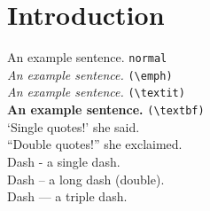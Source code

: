 \section{Introduction}

An example sentence. \texttt{normal}\\
\emph{An example sentence.} \texttt{(\textbackslash emph)}\\
\textit{An example sentence.} \texttt{(\textbackslash textit)}\\
\textbf{An example sentence.} \texttt{(\textbackslash textbf)}\\
`Single quotes!' she said.\\
``Double quotes!'' she exclaimed.\\
Dash - a single dash.\\
Dash -- a long dash (double).\\
Dash --- a triple dash.
